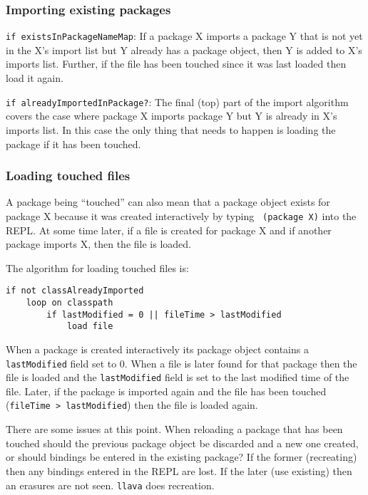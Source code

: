 \documentclass[final]{ieee}
\begin{document}
\subsubsection{Importing existing packages}

{\tt if existsInPackageNameMap}: If a package X imports a package Y
that is not yet in the X's import list but Y already has a package
object, then Y is added to X's imports list.  Further, if the file has
been touched since it was last loaded then load it again.

{\tt if alreadyImportedInPackage?}: The final (top) part of the import
algorithm covers the case where package X imports package Y but Y is
already in X's imports list.  In this case the only thing that needs
to happen is loading the package if it has been touched.

\subsubsection{Loading touched files}

A package being ``touched'' can also mean that a package object exists
for package X because it was created interactively by typing {\tt
(package X)} into the REPL.  At some time later, if a file is created
for package X and if another package imports X, then the file is
loaded.

The algorithm for loading touched files is:

\small
\begin{verbatim}
if not classAlreadyImported
    loop on classpath
        if lastModified = 0 || fileTime > lastModified
            load file
\end{verbatim}
\normalsize

When a package is created interactively its package object contains a
{\tt lastModified} field set to 0.  When a file is later found for
that package then the file is loaded and the {\tt lastModified} field
is set to the last modified time of the file.  Later, if the package
is imported again and the file has been touched ({\tt fileTime >
lastModified}) then the file is loaded again.

There are some issues at this point.  When reloading a package that
has been touched should the previous package object be discarded and a
new one created, or should bindings be entered in the existing
package?  If the former (recreating) then any bindings entered in the
REPL are lost.  If the later (use existing) then an erasures are not
seen.  {\tt llava} does recreation.
\end{document}
